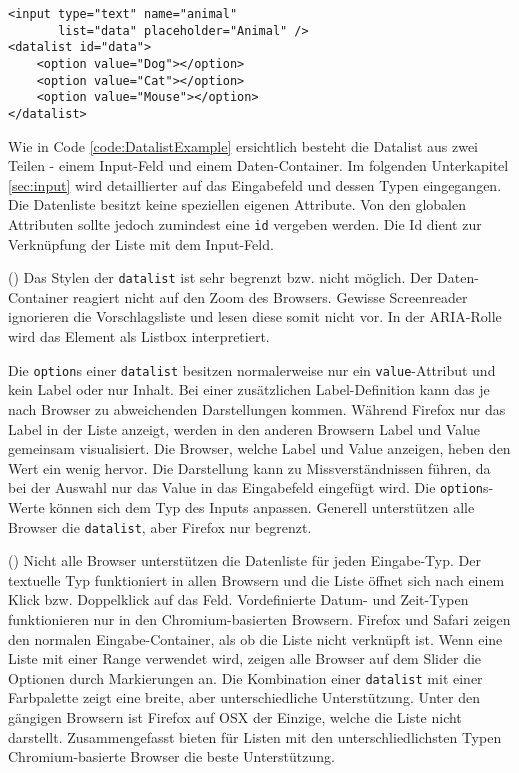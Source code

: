 \begin{lstlisting}[style = htmlcssjs, caption = Datalist Example, label = code:DatalistExample]
<input type="text" name="animal" 
       list="data" placeholder="Animal" />
<datalist id="data">
    <option value="Dog"></option>
    <option value="Cat"></option>
    <option value="Mouse"></option>
</datalist>
\end{lstlisting}

Wie in Code \ref{code:DatalistExample} ersichtlich besteht die Datalist aus zwei Teilen - einem Input-Feld und einem Daten-Container. 
Im folgenden Unterkapitel \ref{sec:input} wird detaillierter auf das Eingabefeld und dessen Typen eingegangen.
Die Datenliste besitzt keine speziellen eigenen Attribute.
Von den globalen Attributen sollte jedoch zumindest eine \texttt{id} vergeben werden.
Die Id dient zur Verknüpfung der Liste mit dem Input-Feld. 

(\cite{datalistMdn}) Das Stylen der \texttt{datalist} ist sehr begrenzt bzw. nicht möglich. 
Der Daten-Container reagiert nicht auf den Zoom des Browsers.
Gewisse Screenreader ignorieren die Vorschlagsliste und lesen diese somit nicht vor.
In der ARIA-Rolle wird das Element als Listbox interpretiert.

Die \texttt{option}s einer \texttt{datalist} besitzen normalerweise nur ein \texttt{value}-Attribut und kein Label oder nur Inhalt.
Bei einer zusätzlichen Label-Definition kann das je nach Browser zu abweichenden Darstellungen kommen. 
Während Firefox nur das Label in der Liste anzeigt, werden in den anderen Browsern Label und Value gemeinsam visualisiert. 
Die Browser, welche Label und Value anzeigen, heben den Wert ein wenig hervor.
Die Darstellung kann zu Missverständnissen führen, da bei der Auswahl nur das Value in das Eingabefeld eingefügt wird. 
Die \texttt{option}s-Werte können sich dem Typ des Inputs anpassen. 
Generell unterstützen alle Browser die \texttt{datalist}, aber Firefox nur begrenzt.

(\cite{datalistMdn}) Nicht alle Browser unterstützen die Datenliste für jeden Eingabe-Typ.
Der textuelle Typ funktioniert in allen Browsern und die Liste öffnet sich nach einem Klick bzw. Doppelklick auf das Feld.
Vordefinierte Datum- und Zeit-Typen funktionieren nur in den Chromium-basierten Browsern. 
Firefox und Safari zeigen den normalen Eingabe-Container, als ob die Liste nicht verknüpft ist.
Wenn eine Liste mit einer Range verwendet wird, zeigen alle Browser auf dem Slider die Optionen durch Markierungen an.
Die Kombination einer \texttt{datalist} mit einer Farbpalette zeigt eine breite, aber unterschiedliche Unterstützung. 
Unter den gängigen Browsern ist Firefox auf OSX der Einzige, welche die Liste nicht darstellt.
Zusammengefasst bieten für Listen mit den unterschliedlichsten Typen Chromium-basierte Browser die beste Unterstützung.


